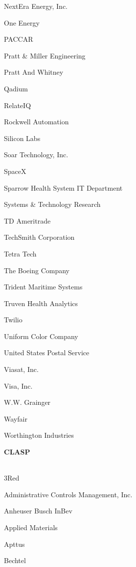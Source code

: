 \documentclass[twoside]{article}
\begin{document}
\begin{center}
\begin{multicols}{5}
\begin{FlushLeft}
\begin{compactitem}
\item NextEra Energy, Inc.
\item One Energy
\item PACCAR
\item Pratt \& Miller Engineering
\item Pratt And Whitney
\item Qadium
\item RelateIQ
\item Rockwell Automation
\item Silicon Labs
\item Soar Technology, Inc.
\item SpaceX
\item Sparrow Health System IT Department
\item Systems \& Technology Research
\item TD Ameritrade
\item TechSmith Corporation
\item Tetra Tech
\item The Boeing Company
\item Trident Maritime Systems
\item Truven Health Analytics
\item Twilio
\item Uniform Color Company
\item United States Postal Service
\item Viasat, Inc.
\item Visa, Inc.
\item W.W. Grainger
\item Wayfair
\item Worthington Industries
\end{compactitem}
        \end{FlushLeft}
        \vspace{1em}
        {\fontsize{14}{16}\selectfont \bf CLASP}\\
        \vspace{-1em}
        ~\hrulefill~
        \vspace{-.9em}
        \begin{FlushLeft}
        \begin{compactitem}
        \item 3Red
\item Administrative Controls Management, Inc.
\item Anheuser Busch InBev
\item Applied Materials
\item Apttus
\item Bechtel

\end{compactitem}
\end{FlushLeft}
\end{multicols}
\end{center}
\end{document}
